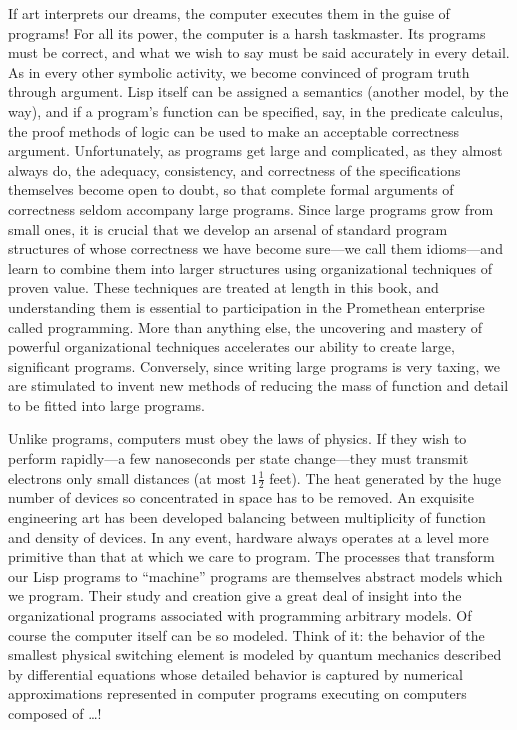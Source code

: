 If art interprets our dreams, the computer executes them in the guise of programs!
For all its power, the computer is a harsh taskmaster.
Its programs must be correct, and what we wish to say must be said accurately in every detail.
As in every other symbolic activity, we become convinced of program truth through argument.
Lisp itself can be assigned a semantics (another model, by the way), and if a program’s function can be specified, say, in the predicate calculus, the proof methods of logic can be used to make an acceptable correctness argument.
Unfortunately, as programs get large and complicated, as they almost always do, the adequacy, consistency, and correctness of the specifications themselves become open to doubt, so that complete formal arguments of correctness seldom accompany large programs.
Since large programs grow from small ones, it is crucial that we develop an arsenal of standard program structures of whose correctness we have become sure---we call them idioms---and learn to combine them into larger structures using organizational techniques of proven value.
These techniques are treated at length in this book, and understanding them is essential to participation in the Promethean enterprise called programming.
More than anything else, the uncovering and mastery of powerful organizational techniques accelerates our ability to create large, significant programs.
Conversely, since writing large programs is very taxing, we are stimulated to invent new methods of reducing the mass of function and detail to be fitted into large programs.

Unlike programs, computers must obey the laws of physics.
If they wish to perform rapidly---a few nanoseconds per state change---they must transmit
electrons only small distances (at most \( 1 \frac{1}{2} \) feet).
The heat generated by the huge number of devices so concentrated in space has to be removed.
An exquisite engineering art has been developed balancing between multiplicity of
function and density of devices.
In any event, hardware always operates at a level more primitive than that at which we care to program.
The processes that transform our Lisp programs to “machine” programs are themselves abstract
models which we program.
Their study and creation give a great deal of insight into the organizational programs associated with programming arbitrary models.
Of course the computer itself can be so modeled.
Think of it:
the behavior of the smallest physical switching element is modeled by quantum mechanics
described by differential equations whose detailed behavior is captured by
numerical approximations represented in computer programs executing on
computers composed of …!

